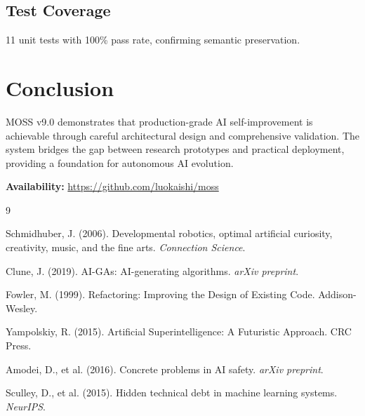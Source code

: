 \documentclass[11pt,a4paper]{article}
\begin{document}
\subsection{Test Coverage}

11 unit tests with 100\% pass rate, confirming semantic preservation.

\section{Conclusion}

MOSS v9.0 demonstrates that production-grade AI self-improvement is achievable through careful architectural design and comprehensive validation. The system bridges the gap between research prototypes and practical deployment, providing a foundation for autonomous AI evolution.

\textbf{Availability:} \url{https://github.com/luokaishi/moss}

\begin{thebibliography}{9}

Schmidhuber, J. (2006). Developmental robotics, optimal artificial curiosity, creativity, music, and the fine arts. \textit{Connection Science}.

Clune, J. (2019). AI-GAs: AI-generating algorithms. \textit{arXiv preprint}.

Fowler, M. (1999). Refactoring: Improving the Design of Existing Code. Addison-Wesley.

Yampolskiy, R. (2015). Artificial Superintelligence: A Futuristic Approach. CRC Press.

Amodei, D., et al. (2016). Concrete problems in AI safety. \textit{arXiv preprint}.

Sculley, D., et al. (2015). Hidden technical debt in machine learning systems. \textit{NeurIPS}.

\end{thebibliography}
\end{document}
